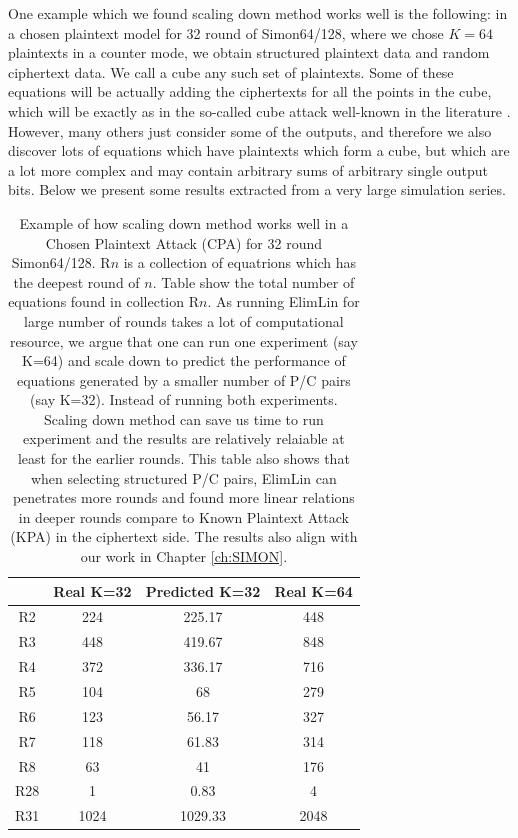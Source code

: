 One example which we found scaling down method works well is the following: in a chosen plaintext model for 32 round of Simon64/128, where we chose $K=64$ plaintexts in a counter mode, we obtain structured plaintext data and random ciphertext data. We call a cube any such set of plaintexts. 
Some of these equations will be actually adding the ciphertexts for all the points in the cube, which will be exactly as in the so-called cube attack well-known in the literature \cite{dinur2009cube}. However, many others just consider some of the outputs, and therefore we also discover lots of equations which have plaintexts which form a cube, but which are a lot more complex and may contain arbitrary sums of arbitrary single output bits.  
Below we present some results extracted from a very large simulation series.
 
\begin{table}[h!]
	\caption[Scaling down method results for 32 Rounds Simon]{Example of how scaling down method works well in a Chosen Plaintext Attack (CPA) for 32 round Simon64/128. R$n$ is a collection of equatrions which has the deepest round of $n$. Table show the total number of equations found in collection R$n$. As running ElimLin for large number of rounds takes a lot of computational resource, we argue that one can run one experiment (say K=64) and scale down to predict the performance of equations generated by a smaller number of P/C pairs (say K=32). Instead of running both experiments. Scaling down method can save us time to run experiment and the results are relatively relaiable at least for the earlier rounds. This table also shows that when selecting structured P/C pairs, ElimLin can penetrates more rounds and found more linear relations in deeper rounds compare to Known Plaintext Attack (KPA) in the ciphertext side. The results also align with our work in Chapter \ref{ch:SIMON}. } \label{tab:scallingdownworks} \centering
	\begin{tabular}{|c|c|c|c|}
		\hline
		& Real K=32 & Predicted K=32 & Real K=64 \\ \hline
		R2  & 224     & 225.17     & 448     \\ \hline
		R3  & 448     & 419.67     & 848     \\ \hline
		R4  & 372     & 336.17     & 716     \\ \hline
		R5  & 104     & 68         & 279     \\ \hline
		R6  & 123     & 56.17      & 327     \\ \hline
		R7  & 118     & 61.83      & 314     \\ \hline
		R8  & 63      & 41         & 176     \\ \hline
		R28 & 1       & 0.83       & 4       \\ \hline
		R31 & 1024    & 1029.33    & 2048    \\ \hline
	\end{tabular}
\end{table}

